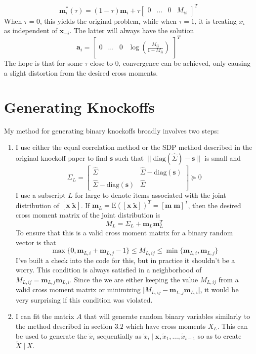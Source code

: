 \documentclass[11pt]{article}
\newcommand{\E}{\mathrm{E}}
\newcommand{\diag}{\mathrm{diag}}
\newcommand{\st}{ \; \big | \:}
\theoremstyle{definition}
\begin{document}
\begin{enumerate}
    \[\mathbf m_i^*(\tau) = (1-\tau)\mathbf m_i + \tau \left[ \begin{array}{cccc} 0 & \ldots & 0 & M_{ii} \end{array} \right]^T \]
            When $\tau=0$, this yields the original problem, while when $\tau=1$, it is treating $x_i$ as independent of $\mathbf x_{-i}$. The latter will always have the solution
            \[\mathbf a_i = \left[ \begin{array}{cccc} 0 & \ldots & 0 & \log\left(\frac{M_{ii}}{1-M_{ii}}\right) \end{array} \right]^T \]
            The hope is that for some $\tau$ close to $0$, convergence can be achieved, only causing a slight distortion from the desired cross moments.
    \end{enumerate}

\section{Generating Knockoffs}
    My method for generating binary knockoffs broadly involves two steps:
    \begin{enumerate}
        \item I use either the equal correlation method or the SDP method described in the original knockoff paper to find $\mathbf s$ such that $\|\diag(\hat\Sigma)-\mathbf s\|$ is small and 
        \[ \Sigma_L = \left[\begin{array}{cc}  \hat\Sigma & \hat\Sigma - \diag(\mathbf s )\\ \hat\Sigma - \diag(\mathbf s) & \hat\Sigma \end{array}\right] \succeq 0 \]
        I use a subscript $L$ for large to denote items associated with the joint distribution of $[\mathbf x \; \mathbf{\tilde x}]$. If $\mathbf m_L = \E\left([\mathbf x \; \mathbf{\tilde x}]\right)^T = [\mathbf m \; \mathbf m]^T$, then the desired cross moment matrix of the joint distribution is 
        \[ M_L = \Sigma_L + \mathbf m_L\mathbf m_L^T\]
        To ensure that this is a valid cross moment matrix for a binary random vector is that 
        \[\max\{0,\mathbf m_{L,i} + \mathbf m_{L,j} -1\} \leq M_{L,ij} \leq \min\{\mathbf m_{L,i}, \mathbf m_{L,j}\} \]
        I've built a check into the code for this, but in practice it shouldn't be a worry. This condition is always satisfied in a neighborhood of $M_{L,ij} = \mathbf m_{L,j}\mathbf m_{L,i}$. Since the we are either keeping the value $M_{L,ij}$ from a valid cross moment matrix or minimizing $\vert M_{L,ij} - \mathbf m_{L,j}\mathbf m_{L,i}\vert$, it would be very surprising if this condition was violated.
        
        \item I can fit the matrix $A$ that will generate random binary variables similarly to the method described in section $3.2$ which have cross moments $X_L$. This can be used to generate the $\tilde x_i$ sequentially as $\tilde x_i \st \mathbf x,\tilde x_1,\ldots,\tilde x_{i-1}$ so as to create $\tilde X \st X$. 
    \end{enumerate}
\end{document}
